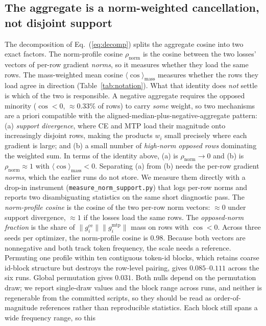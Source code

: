 \subsection{The aggregate is a norm-weighted cancellation, not disjoint support}
\label{sec:mechanism}
The decomposition of Eq.~(\ref{eq:decomp}) splits the aggregate cosine into two exact factors. The
norm-profile cosine $\rho_{\text{norm}}$ is the cosine between the two losses'
vectors of per-row gradient \emph{norms}, so it measures whether they load the
same rows. The mass-weighted mean cosine $\langle\cos\rangle_{\text{mass}}$
measures whether the rows they load agree in direction
(Table~\ref{tab:notation}). What that identity does \emph{not}
settle is which of the two is responsible.
A negative aggregate requires the opposed minority ($\cos<0$, $\approx 0.33\%$ of
rows) to carry \emph{some} weight, so two mechanisms are a priori compatible with
the aligned-median-plus-negative-aggregate pattern: (a) \emph{support
divergence}, where CE and MTP load their magnitude onto increasingly disjoint
rows, making the products $w_i$ small precisely where each gradient is large; and
(b) a small number of \emph{high-norm opposed rows} dominating the weighted sum.
In terms of the identity above, (a) is $\rho_{\text{norm}} \to 0$ and (b) is
$\rho_{\text{norm}} \approx 1$ with $\langle\cos\rangle_{\text{mass}} < 0$.
Separating (a) from (b) needs the per-row gradient \emph{norms}, which the earlier runs do not store. We measure them directly with a drop-in instrument (\texttt{measure\_norm\_support.py}) that logs per-row norms and reports two disambiguating statistics on the same short diagnostic pass. The \emph{norm-profile cosine} is the cosine of the two per-row norm vectors: $\approx0$ under support divergence, $\approx1$ if the losses load the same rows. The \emph{opposed-norm fraction} is the share of $\lVert g^{\text{ce}}_i\rVert\lVert g^{\text{mtp}}_i\rVert$ mass on rows with $\cos<0$. Across three seeds per
optimizer, the norm-profile cosine is $0.98$. Because both vectors are nonnegative
and both track token frequency, the scale needs a reference. Permuting one profile
within ten contiguous token-id blocks, which retains coarse id-block structure but
destroys the row-level pairing, gives $0.085$--$0.111$ across the six runs. Global
permutation gives $0.031$. Both nulls depend on the permutation draw; we report
single-draw values and the block range across runs, and neither is regenerable from
the committed scripts, so they should be read as order-of-magnitude references
rather than reproducible statistics. Each block still spans a wide frequency range, so this
